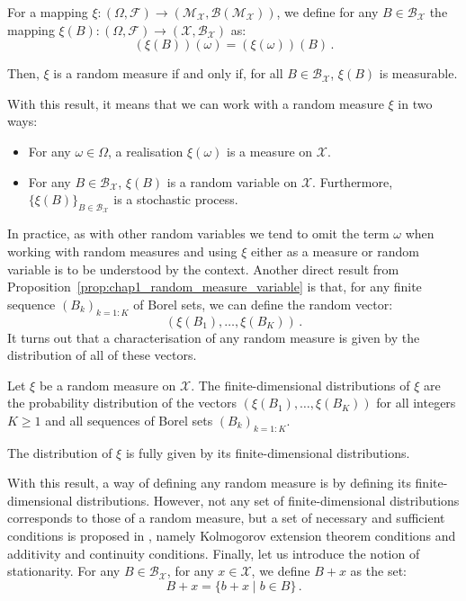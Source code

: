 \begin{proposition}{\parencite[Proposition 1.1.7]{Baccelli2020}}\label{prop:chap1_random_measure_variable}

    For a mapping $\xi:(\Omega, \mathcal{F}) \to (\mathcal{M}_{\mathcal{X}}, \mathcal{B}(\mathcal{M}_{\mathcal{X}}))$, we define for any $B\in\mathcal{B}_{\mathcal{X}}$ the mapping $\xi(B):(\Omega, \mathcal{F}) \to (\mathcal{X}, \mathcal{B}_{\mathcal{X}})$ as:
    \[\left(\xi(B)\right)(\omega) = (\xi(\omega))(B)\,.\]

    Then, $\xi$ is a random measure if and only if, for all $B\in\mathcal{B}_{\mathcal{X}}$, $\xi(B)$ is measurable.
\end{proposition}
With this result, it means that we can work with a random measure $\xi$ in two ways:
\begin{itemize}
    \item For any $\omega\in\Omega$, a realisation $\xi(\omega)$ is a measure on $\mathcal{X}$.
    \item For any $B\in\mathcal{B}_{\mathcal{X}}$, $\xi(B)$ is a random variable on $\mathcal{X}$. Furthermore, $\{\xi(B)\}_{B\in\mathcal{B}_{\mathcal{X}}}$ is a stochastic process.
\end{itemize}
In practice, as with other random variables we tend to omit the term $\omega$ when working with random measures and using $\xi$ either as a measure or random variable is to be understood by the context.
Another direct result from Proposition~\ref{prop:chap1_random_measure_variable} is that, for any finite sequence $(B_k)_{k=1:K}$ of Borel sets, we can define the random vector:
\[(\xi(B_1), \ldots, \xi(B_K))\,.\]
It turns out that a characterisation of any random measure is given by the distribution of all of these vectors.

\begin{proposition}{\parencite[Corollary 9.2.IV]{DaleyV2}}

    Let $\xi$ be a random measure on $\mathcal{X}$. 
    The finite-dimensional distributions of $\xi$ are the probability distribution of the vectors $(\xi(B_1), \ldots, \xi(B_K))$ for all integers $K\geq 1$ and all sequences of Borel sets $(B_k)_{k=1:K}$.

    The distribution of $\xi$ is fully given by its finite-dimensional distributions.
\end{proposition}
With this result, a way of defining any random measure is by defining its finite-dimensional distributions.
However, not any set of finite-dimensional distributions corresponds to those of a random measure, but a set of necessary and sufficient conditions is proposed in \textcite[Conditions 9.2.V-VI]{DaleyV2}, namely Kolmogorov extension theorem conditions and additivity and continuity conditions.
Finally, let us introduce the notion of stationarity. 
For any $B\in\mathcal{B}_{\mathcal{X}}$, for any $x\in\mathcal{X}$, we define $B+x$ as the set:
\[B+x = \{b + x \mid b\in B\}\,.\]


